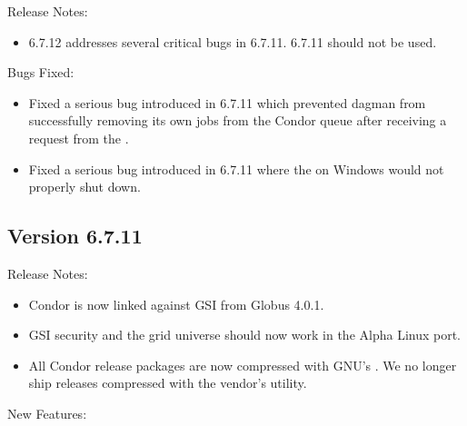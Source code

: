 \noindent Release Notes:

\begin{itemize}

\item 6.7.12 addresses several critical bugs in 6.7.11.  6.7.11 should 
not be used.

\end{itemize}

\noindent Bugs Fixed:

\begin{itemize}

\item Fixed a serious bug introduced in 6.7.11 which prevented \Condor 
{dagman} from successfully removing its own jobs from the Condor  
queue after receiving a  request from the .

\item Fixed a serious bug introduced in 6.7.11 where the  
on Windows would not properly shut down.

\end{itemize}


\subsection*{\label{sec:New-6-7.11}Version 6.7.11}

\noindent Release Notes:

\begin{itemize}

\item Condor is now linked against GSI from Globus 4.0.1.

\item GSI security and the grid universe should now work in the Alpha 
Linux port.

\item All Condor release packages are now compressed with GNU's
  .
  We no longer ship releases compressed with the vendor's
   utility.

\end{itemize}


\noindent New Features:

